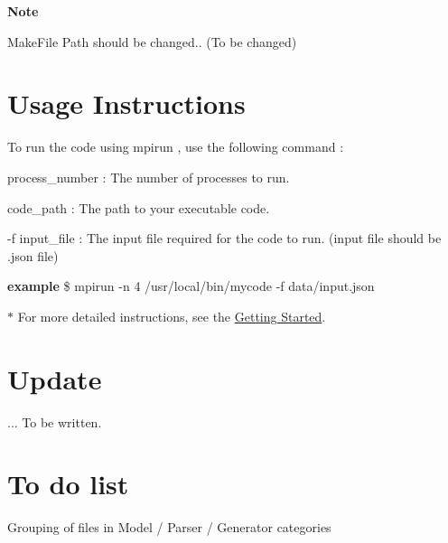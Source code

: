 {\bfseries Note} {\bfseries } 
\begin{DoxyItemize}
\item Make\-File Path should be changed.. (To be changed)
\end{DoxyItemize}\hypertarget{Overview_UsageInstructions}{}\section{Usage Instructions}\label{Overview_UsageInstructions}
To run the code using {\ttfamily  mpirun }, use the following command \-:





\begin{DoxyItemize}
\item process\-\_\-number \-: The number of processes to run.
\item code\-\_\-path \-: The path to your executable code.
\item -\/f input\-\_\-file \-: The input file required for the code to run. (input file should be {\ttfamily .json} file)
\end{DoxyItemize}

{\bfseries example} {\bfseries }  \$ mpirun -\/n 4 /usr/local/bin/mycode -\/f data/input.\-json 

{\bfseries $\ast$} For more detailed instructions, see the \hyperlink{GettingStarted}{Getting Started}.{\bfseries } \hypertarget{Overview_Update}{}\section{Update}\label{Overview_Update}
... To be written.\hypertarget{Overview_ToDoList}{}\section{To do list}\label{Overview_ToDoList}

\begin{DoxyItemize}
\item Grouping of files in Model / Parser / Generator categories 
\end{DoxyItemize}